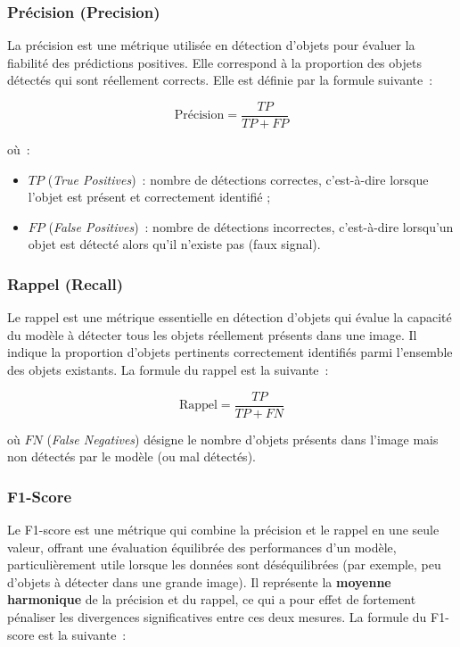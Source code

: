 \subsubsection*{Précision (Precision)}

La précision est une métrique utilisée en détection d'objets pour évaluer la
fiabilité des prédictions positives. Elle correspond à la proportion des objets
détectés qui sont réellement corrects.
Elle est définie par la formule suivante~:

\begin{equation}
\text{Précision} = \frac{TP}{TP + FP}
\label{eq:precision}
\end{equation}

où~:
\begin{itemize}
  \item $TP$ (\textit{True Positives})~: nombre de détections correctes, c'est-à-dire
        lorsque l'objet est présent et correctement identifié ;
  \item $FP$ (\textit{False Positives})~: nombre de détections incorrectes, c'est-à-dire
        lorsqu'un objet est détecté alors qu'il n'existe pas (faux signal).
\end{itemize}

\subsubsection*{Rappel (Recall)}

Le rappel est une métrique essentielle en détection d'objets qui évalue la capacité
du modèle à détecter tous les objets réellement présents dans une image. Il indique
la proportion d'objets pertinents correctement identifiés parmi l'ensemble des
objets existants.
La formule du rappel est la suivante~:

\begin{equation}
\text{Rappel} = \frac{TP}{TP + FN}
\label{eq:rappel}
\end{equation}

où $FN$ (\textit{False Negatives}) désigne le nombre d'objets présents dans l'image
mais non détectés par le modèle (ou mal détectés).

\subsubsection*{F1-Score}

Le F1-score est une métrique qui combine la précision et le rappel en une seule valeur,
offrant une évaluation équilibrée des performances d'un modèle, particulièrement utile
lorsque les données sont déséquilibrées (par exemple, peu d'objets à détecter dans une
grande image). Il représente la \textbf{moyenne harmonique} de la précision et du rappel,
ce qui a pour effet de fortement pénaliser les divergences significatives entre ces deux mesures.
La formule du F1-score est la suivante~:

